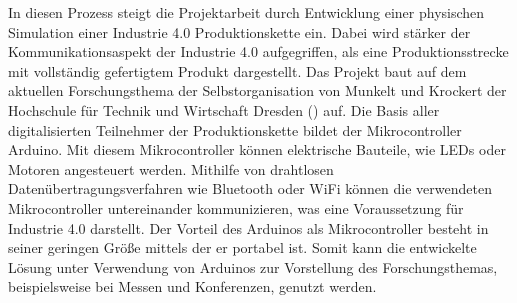 In diesen Prozess steigt die Projektarbeit durch Entwicklung einer physischen Simulation einer Industrie 4.0 Produktionskette ein. Dabei wird stärker der Kommunikationsaspekt der Industrie 4.0 aufgegriffen, als eine Produktionsstrecke mit vollständig gefertigtem Produkt dargestellt. Das Projekt baut auf dem aktuellen Forschungsthema der Selbstorganisation von  Munkelt und Krockert der Hochschule für Technik und Wirtschaft Dresden (\citeyear{agents}) auf.
Die Basis aller digitalisierten Teilnehmer der Produktionskette bildet der Mikrocontroller Arduino. Mit diesem Mikrocontroller können elektrische Bauteile, wie LEDs oder Motoren angesteuert werden. Mithilfe von drahtlosen Datenübertragungsverfahren wie Bluetooth oder WiFi können die verwendeten Mikrocontroller untereinander kommunizieren, was eine Voraussetzung für Industrie 4.0 darstellt. Der Vorteil des Arduinos als Mikrocontroller besteht in seiner geringen Größe mittels der er portabel ist. Somit kann die entwickelte Lösung unter Verwendung von Arduinos  zur Vorstellung des Forschungsthemas, beispielsweise bei Messen und Konferenzen, genutzt werden. 